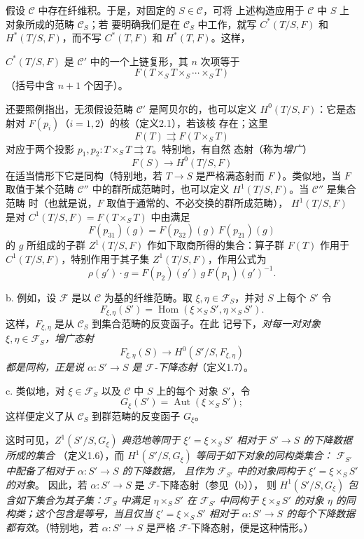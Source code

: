 假设 $\mathcal C$ 中存在纤维积。于是，对固定的 $S\in\mathcal C$，可将
上述构造应用于 $\mathcal C$ 中 $S$ 上对象所成的范畴 $\mathcal C_S$；若
要明确我们是在 $\mathcal C_S$ 中工作，就写 $C^*(T/S,F)$ 和
$H^*(T/S,F)$，而不写 $C^*(T,F)$ 和 $H^*(T,F)$。这样，

$C^*(T/S,F)$ 是 $\mathcal C'$ 中的一个上链复形，其 $n$ 次项等于
\[
  F(T\times_ST\times_S\cdots\times_ST)
\]
（括号中含 $n+1$ 个因子）。

还要照例指出，无须假设范畴 $\mathcal C'$ 是阿贝尔的，也可以定义
$H^0(T/S,F)$：它是态射对 $F(p_i)$（$i=1,2$）的核（定义2.1），若该核
存在；这里
\[
  F(T)\rightrightarrows F(T\times_ST)
\]
对应于两个投影 $p_1,p_2:T\times_ST\rightrightarrows T$。特别地，有自然
态射（称为\emph{增广}）
\[
  F(S)\longrightarrow H^0(T/S,F)
\]
在适当情形下它是同构（特别地，若 $T\longrightarrow S$ 是严格满态射而
$F$ ）。类似地，当 $F$ 取值于某个范畴 $\mathcal C''$
中的群所成范畴时，也可以定义 $H^1(T/S,F)$。当 $\mathcal C''$ 是集合范畴
时（也就是说，$F$ 取值于通常的、不必交换的群所成范畴），
$H^1(T/S,F)$ 是对 $C^1(T/S,F)=F(T\times_ST)$ 中由满足
\[
  F(p_{31})(g)=F(p_{32})(g)\,F(p_{21})(g)
\]
的 $g$ 所组成的子群 $Z^1(T/S,F)$ 作如下取商所得的集合：算子群 $F(T)$
作用于 $C^1(T/S,F)$，特别作用于其子集 $Z^1(T/S,F)$，作用公式为
\[
  \rho(g')\cdot g=F(p_2)(g')\,g\,F(p_1)(g')^{-1}.
\]

\medskip\noindent
b. 例如，设 $\mathcal F$ 是以 $\mathcal C$ 为基的纤维范畴。取
$\xi,\eta\in\mathcal F_S$，并对 $S$ 上每个 $S'$ 令
\[
  F_{\xi,\eta}(S')=
  \operatorname{Hom}(\xi\times_SS',\eta\times_SS').
\]
这样，$F_{\xi,\eta}$ 是从 $\mathcal C_S$ 到集合范畴的反变函子。在此
记号下，\emph{对每一对对象 $\xi,\eta\in\mathcal F_S$，增广态射}
\[
  F_{\xi,\eta}(S)\longrightarrow H^0(S'/S,F_{\xi,\eta})
\]
\emph{都是同构，正是说 $\alpha:S'\longrightarrow S$ 是
$\mathcal F$-下降态射}（定义1.7）。

\medskip\noindent
c. 类似地，对 $\xi\in\mathcal F_S$ 以及 $\mathcal C$ 中 $S$ 上的每个
对象 $S'$，令
\[
  G_\xi(S')=\operatorname{Aut}(\xi\times_SS') ;
\]
这样便定义了从 $\mathcal C_S$ 到群范畴的反变函子 $G_\xi$。

这时可见，$Z^1(S'/S,G_\xi)$ \emph{典范地等同于
$\xi'=\xi\times_SS'$ 相对于 $S'\longrightarrow S$ 的下降数据所成的集合}
（定义1.6），而 $H^1(S'/S,G_\xi)$ \emph{等同于如下对象的同构类集合：
$\mathcal F_{S'}$ 中配备了相对于 $\alpha:S'\longrightarrow S$ 的下降数据，
且作为 $\mathcal F_{S'}$ 中的对象同构于 $\xi'=\xi\times_SS'$ 的对象}。
因此，若 $\alpha:S'\longrightarrow S$ 是 $\mathcal F$-下降态射（参见（b）），
则 $H^1(S'/S,G_\xi)$ \emph{包含如下集合为其子集：$\mathcal F_S$ 中满足
$\eta\times_SS'$ 在 $\mathcal F_{S'}$ 中同构于 $\xi\times_SS'$ 的对象
$\eta$ 的同构类；这个包含是等号，当且仅当
$\xi'=\xi\times_SS'$ 相对于 $\alpha:S'\longrightarrow S$ 的每个下降数据
都有效}。（特别地，若 $\alpha:S'\longrightarrow S$ 是严格
$\mathcal F$-下降态射，便是这种情形。）

